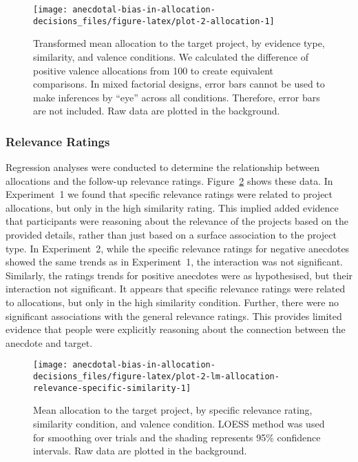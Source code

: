 \documentclass[
  man, donotrepeattitle,floatsintext]{apa7}
\theoremstyle{definition}
\theoremstyle{definition}
\theoremstyle{definition}
\theoremstyle{definition}
\theoremstyle{remark}
\begin{document}
\begin{figure}
\texttt{[image: anecdotal-bias-in-allocation-decisions\_files/figure-latex/plot-2-allocation-1]} \caption{Transformed mean allocation to the target project, by evidence type, similarity, and valence conditions. We calculated the difference of positive valence allocations from 100 to create equivalent comparisons. In mixed factorial designs, error bars cannot be used to make inferences by ``eye'' across all conditions. Therefore, error bars are not included. Raw data are plotted in the background.}\label{fig:plot-2-allocation}
\end{figure}

\hypertarget{relevance-ratings-1}{%
\subsubsection{Relevance Ratings}\label{relevance-ratings-1}}

Regression analyses were conducted to determine the relationship between
allocations and the follow-up relevance ratings.
Figure~\ref{fig:plot-2-lm-allocation-relevance-specific-similarity}
shows these data. In Experiment~1 we found that specific relevance ratings were
related to project allocations, but only in the high similarity rating. This
implied added evidence that participants were reasoning about the relevance of
the projects based on the provided details, rather than just based on a surface
association to the project type. In Experiment~2, while the specific relevance
ratings for negative anecdotes showed the same trends as in Experiment~1, the
interaction was not significant. Similarly, the ratings trends for positive
anecdotes were as hypothesised, but their interaction not significant. It
appears that specific relevance ratings were related to allocations, but only in
the high similarity condition. Further, there were no significant associations
with the general relevance ratings. This provides limited evidence that people
were explicitly reasoning about the connection between the anecdote and target.



\begin{figure}
\texttt{[image: anecdotal-bias-in-allocation-decisions\_files/figure-latex/plot-2-lm-allocation-relevance-specific-similarity-1]} \caption{Mean allocation to the target project, by specific relevance rating, similarity condition, and valence condition. LOESS method was used for smoothing over trials and the shading represents 95\% confidence intervals. Raw data are plotted in the background.}\label{fig:plot-2-lm-allocation-relevance-specific-similarity}
\end{figure}
\end{document}
